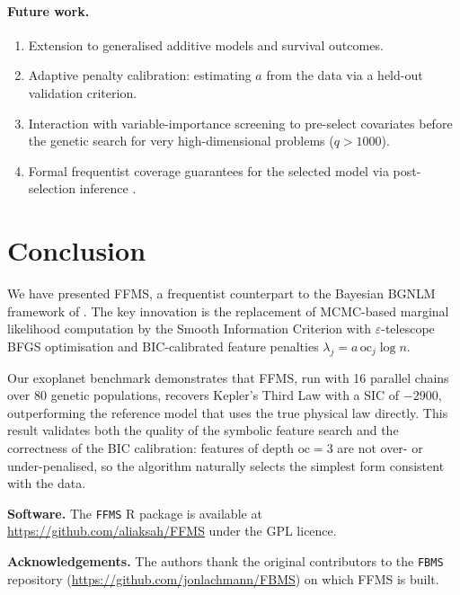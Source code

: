 \documentclass[12pt,a4paper]{article}
\newcommand{\oc}{\mathrm{oc}}
\begin{document}
\paragraph{Future work.}
\begin{enumerate}[label=(\roman*)]
  \item Extension to generalised additive models and survival outcomes.
  \item Adaptive penalty calibration: estimating $a$ from the data via a held-out
        validation criterion.
  \item Interaction with variable-importance screening to pre-select covariates
        before the genetic search for very high-dimensional problems ($q > 1000$).
  \item Formal frequentist coverage guarantees for the selected model via
        post-selection inference \citep{Lee2016}.
\end{enumerate}

\section{Conclusion}
\label{sec:conclusion}

We have presented FFMS, a frequentist counterpart to the Bayesian BGNLM
framework of \citet{Hubin2021JAIR}.  The key innovation is the replacement of
MCMC-based marginal likelihood computation by the Smooth Information Criterion
with $\varepsilon$-telescope BFGS optimisation and BIC-calibrated feature
penalties $\lambda_j = a\,\oc_j\log n$.

Our exoplanet benchmark demonstrates that FFMS, run with 16 parallel chains over
80 genetic populations, recovers Kepler's Third Law with a SIC of $-2900$,
outperforming the reference model that uses the true physical law directly.
This result validates both the quality of the symbolic feature search and the
correctness of the BIC calibration: features of depth $\oc=3$ are not over- or
under-penalised, so the algorithm naturally selects the simplest form consistent
with the data.

\bigskip

\noindent\textbf{Software.}
The \texttt{FFMS} R package is available at
\url{https://github.com/aliaksah/FFMS} under the GPL licence.

\bigskip
\noindent\textbf{Acknowledgements.}
The authors thank the original contributors to the \texttt{FBMS} repository
(\url{https://github.com/jonlachmann/FBMS}) on which FFMS is built.
\end{document}
